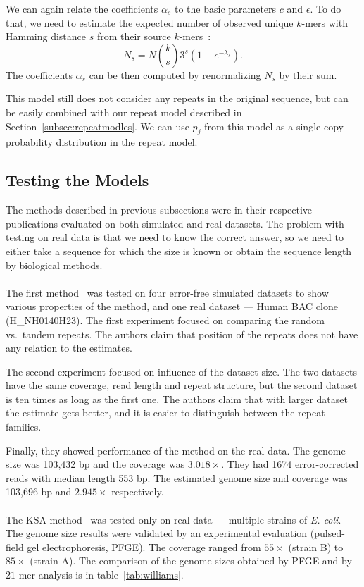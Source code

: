We can again relate the coefficients $\alpha_s$ to the basic parameters $c$ and $\epsilon$. To do that, we need to estimate the expected number of observed unique $k$-mers with Hamming distance $s$ from their source $k$-mers~\cite{covest}:
$$N_s = N {k \choose s} 3^s (1- e^{-\lambda_s}).$$
The coefficients $\alpha_s$ can be then computed by renormalizing $N_s$ by their sum.

This model still does not consider any repeats in the original sequence, but can be easily combined with our repeat model described in Section~\ref{subsec:repeatmodles}. We can use $p_j$ from this model as a single-copy probability distribution in the repeat model.

\subsection{Testing the Models}
The methods described in previous subsections were in their respective publications evaluated on both simulated and real datasets. The problem with testing on real data is that we need to know the correct answer, so we need to either take a sequence for which the size is known or obtain the sequence length by biological methods.

\paragraph{}The first method~\cite{waterman} was tested on four error-free simulated datasets to show various properties of the method, and one real dataset --- Human BAC clone (H\_NH0140H23). The first experiment focused on comparing the random vs.\ tandem repeats. The authors claim that position of the repeats does not have any relation to the estimates.

The second experiment focused on influence of the dataset size. The two datasets have the same coverage, read length and repeat structure, but the second dataset is ten times as long as the first one. The authors claim that with larger dataset the estimate gets better, and it is easier to distinguish between the repeat families.

Finally, they showed performance of the method on the real data.
The genome size was 103,432 bp and the coverage was $3.018\times$.
They had 1674 error-corrected reads with median length 553 bp.
The estimated genome size and coverage was 103,696 bp and $2.945\times$ respectively.

\paragraph{}The KSA method~\cite{williams} was tested only on real data --- multiple strains of \emph{E. coli}. The genome size results were validated by an experimental evaluation (pulsed-field gel electrophoresis, PFGE). The coverage ranged from $55\times$ (strain B) to $85\times$ (strain A). The comparison of the genome sizes obtained by PFGE and by $21$-mer analysis is in table~\ref{tab:williams}.

